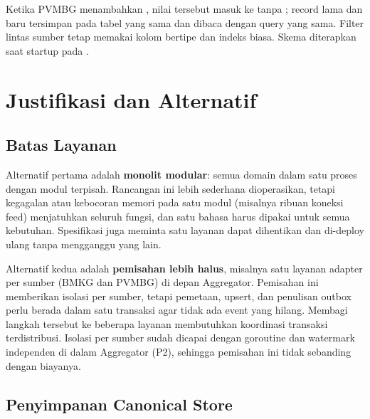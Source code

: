 Ketika PVMBG menambahkan , nilai tersebut masuk ke
 tanpa ; record lama dan baru tersimpan pada
tabel yang sama dan dibaca dengan query yang sama. Filter lintas sumber tetap
memakai kolom bertipe dan indeks biasa. Skema diterapkan saat startup pada
.

\section{Justifikasi dan Alternatif}

\subsection{Batas Layanan}

Alternatif pertama adalah \textbf{monolit modular}: semua domain dalam satu
proses dengan modul terpisah. Rancangan ini lebih sederhana dioperasikan,
tetapi kegagalan atau kebocoran memori pada satu modul (misalnya ribuan
koneksi feed) menjatuhkan seluruh fungsi, dan satu bahasa harus dipakai untuk
semua kebutuhan. Spesifikasi juga meminta satu layanan dapat dihentikan dan
di-deploy ulang tanpa mengganggu yang lain.

Alternatif kedua adalah \textbf{pemisahan lebih halus}, misalnya satu layanan
adapter per sumber (BMKG dan PVMBG) di depan Aggregator. Pemisahan ini
memberikan isolasi per sumber, tetapi pemetaan, upsert, dan penulisan outbox
perlu berada dalam satu transaksi agar tidak ada event yang hilang. Membagi
langkah tersebut ke beberapa layanan membutuhkan koordinasi transaksi
terdistribusi. Isolasi per sumber sudah dicapai dengan goroutine dan
watermark independen di dalam Aggregator (P2), sehingga pemisahan ini tidak
sebanding dengan biayanya.

\subsection{Penyimpanan Canonical Store}

